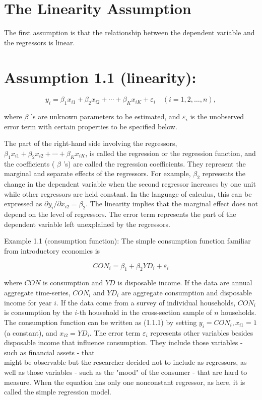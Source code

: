 \documentclass[10pt]{article}
\begin{document}
\section*{The Linearity Assumption}
The first assumption is that the relationship between the dependent variable and the regressors is linear.

\section*{Assumption 1.1 (linearity):}

\begin{equation*}
y_{i}=\beta_{1} x_{i 1}+\beta_{2} x_{i 2}+\cdots+\beta_{K} x_{i K}+\varepsilon_{i} \quad(i=1,2, \ldots, n), \tag{1.1.1}
\end{equation*}


where $\beta$ 's are unknown parameters to be estimated, and $\varepsilon_{i}$ is the unobserved error term with certain properties to be specified below.

The part of the right-hand side involving the regressors, $\beta_{1} x_{i 1}+\beta_{2} x_{i 2}+\cdots+\beta_{K} x_{i K}$, is called the regression or the regression function, and the coefficients ( $\beta$ 's) are called the regression coefficients. They represent the marginal and separate effects of the regressors. For example, $\beta_{2}$ represents the change in the dependent variable when the second regressor increases by one unit while other regressors are held constant. In the language of calculus, this can be expressed as $\partial y_{i} / \partial x_{i 2}=\beta_{2}$. The linearity implies that the marginal effect does not depend on the level of regressors. The error term represents the part of the dependent variable left unexplained by the regressors.

Example 1.1 (consumption function): The simple consumption function familiar from introductory economics is


\begin{equation*}
C O N_{i}=\beta_{1}+\beta_{2} Y D_{i}+\varepsilon_{i} \tag{1.1.2}
\end{equation*}


where $C O N$ is consumption and $Y D$ is disposable income. If the data are annual aggregate time-series, $C O N_{i}$ and $Y D_{i}$ are aggregate consumption and disposable income for year $i$. If the data come from a survey of individual households, $C O N_{i}$ is consumption by the $i$-th household in the cross-section sample of $n$ households. The consumption function can be written as (1.1.1) by setting $y_{i}=C O N_{i}, x_{i 1}=1$ (a constant), and $x_{i 2}=Y D_{i}$. The error term $\varepsilon_{i}$ represents other variables besides disposable income that influence consumption. They include those variables - such as financial assets - that\\
might be observable but the researcher decided not to include as regressors, as well as those variables - such as the "mood" of the consumer - that are hard to measure. When the equation has only one nonconstant regressor, as here, it is called the simple regression model.
\end{document}
